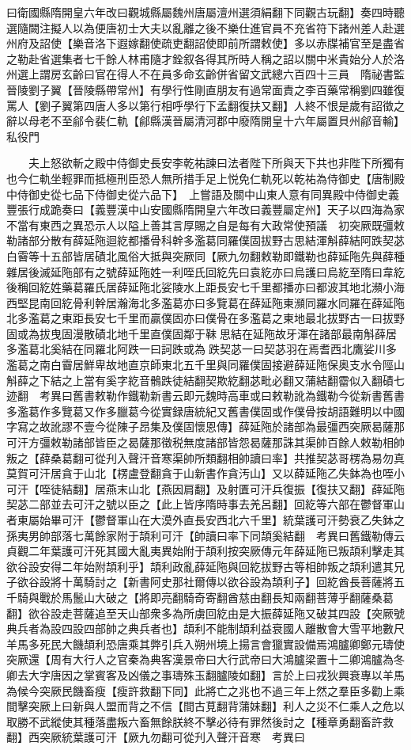 曰衛國縣隋開皇六年改曰觀城縣屬魏州唐屬澶州選須絹翻下同觀古玩翻】奏四時聽選隨闕注擬人以為便唐初士大夫以亂離之後不樂仕進官員不充省符下諸州差人赴選州府及詔使【樂音洛下遐嫁翻使疏吏翻詔使即前所謂敕使】多以赤牒補官至是盡省之勒赴省選集者七千餘人林甫隨才銓叙各得其所時人稱之詔以關中米貴始分人於洛州選上謂房玄齡曰官在得人不在員多命玄齡併省留文武總六百四十三員　隋祕書監晉陵劉子翼【晉陵縣帶常州】有學行性剛直朋友有過常面責之李百藥常稱劉四雖復罵人【劉子翼第四唐人多以第行相呼學行下孟翻復扶又翻】人終不恨是歲有詔徵之辭以母老不至鄃令裴仁軌【鄃縣漢晉屬清河郡中廢隋開皇十六年屬置貝州鄃音輸】私役門

　　夫上怒欲斬之殿中侍御史長安李乾祐諫曰法者陛下所與天下共也非陛下所獨有也今仁軌坐輕罪而抵極刑臣恐人無所措手足上悦免仁軌死以乾祐為侍御史【唐制殿中侍御史從七品下侍御史從六品下】　上嘗語及關中山東人意有同異殿中侍御史義豐張行成跪奏曰【義豐漢中山安國縣隋開皇六年改曰義豐屬定州】天子以四海為家不當有東西之異恐示人以隘上善其言厚賜之自是每有大政常使預議　初突厥既彊敕勒諸部分散有薛延陁迴紇都播骨科幹多濫葛同羅僕固拔野古思結渾斛薛結阿跌契苾白霫等十五部皆居磧北風俗大抵與突厥同【厥九勿翻敕勒即鐵勒也薛延陁先與薛種雜居後滅延陁部有之號薛延陁姓一利咥氏回紇先曰袁紇亦曰烏護曰烏紇至隋曰韋紇後稱回紇姓藥葛羅氏居薛延陁北娑陵水上距長安七千里都播亦曰都波其地北瀕小海西堅昆南回紇骨利幹居瀚海北多濫葛亦曰多覽葛在薛延陁東瀕同羅水同羅在薛延陁北多濫葛之東距長安七千里而贏僕固亦曰僕骨在多濫葛之東地最北拔野古一曰拔野固或為拔曳固漫散磧北地千里直僕固鄰于靺思結在延陁故牙渾在諸部最南斛薛居多濫葛北奚結在同羅北阿跌一曰訶跌或為跌契苾一曰契苾羽在焉耆西北鷹娑川多濫葛之南白霫居鮮卑故地直京師東北五千里與同羅僕固接避薛延陁保奥支水令陘山斛薛之下結之上當有奚字紇音鶻跌徒結翻契欺紇翻苾毗必翻又蒲結翻霤似入翻磧七迹翻　考異曰舊書敕勒作鐵勒新書云即元魏時高車或曰敕勒訛為鐵勒今從新書舊書多濫葛作多覽葛又作多臘葛今從實録唐統紀又舊書僕固或作僕骨按胡語難明以中國字寫之故訛謬不壹今從陳子昂集及僕固懷恩傳】薛延陁於諸部為最彊西突厥曷薩那可汗方彊敕勒諸部皆臣之曷薩那徵税無度諸部皆怨曷薩那誅其渠帥百餘人敕勒相帥叛之【薛桑葛翻可從刋入聲汗音寒渠帥所類翻相帥讀曰率】共推契苾哥楞為易勿真莫賀可汗居貪于山北【楞盧登翻貪于山新書作貪汚山】又以薛延陁乙失鉢為也咥小可汗【咥徒結翻】居燕末山北【燕因肩翻】及射匱可汗兵復振【復扶又翻】薛延陁契苾二部並去可汗之號以臣之【此上皆序隋時事去羌呂翻】回紇等六部在鬱督軍山者東屬始畢可汗【鬱督軍山在大漠外直長安西北六千里】統葉護可汗勢衰乙失鉢之孫夷男帥部落七萬餘家附于頡利可汗【帥讀曰率下同頡奚結翻　考異曰舊鐵勒傳云貞觀二年葉護可汗死其國大亂夷異始附于頡利按突厥傳元年薛延陁已叛頡利擊走其欲谷設安得二年始附頡利乎】頡利政亂薛延陁與回紇拔野古等相帥叛之頡利遣其兄子欲谷設將十萬騎討之【新書阿史那社爾傳以欲谷設為頡利子】回紇酋長菩薩將五千騎與戰於馬鬛山大破之【將即亮翻騎奇寄翻酋慈由翻長知兩翻菩薄乎翻薩桑葛翻】欲谷設走菩薩追至天山部衆多為所虜回紇由是大振薛延陁又破其四設【突厥號典兵者為設四設四部帥之典兵者也】頡利不能制頡利益衰國人離散會大雪平地數尺羊馬多死民大饑頡利恐唐乘其弊引兵入朔州境上揚言會獵實設備焉鴻臚卿鄭元璹使突厥還【周有大行人之官秦為典客漢景帝曰大行武帝曰大鴻臚梁置十二卿鴻臚為冬卿去大字唐因之掌賓客及凶儀之事璹殊玉翻臚陵如翻】言於上曰戎狄興衰專以羊馬為候今突厥民饑畜瘦【瘦許救翻下同】此將亡之兆也不過三年上然之羣臣多勸上乘間擊突厥上曰新與人盟而背之不信【間古莧翻背蒲妹翻】利人之災不仁乘人之危以取勝不武縱使其種落盡叛六畜無餘朕終不擊必待有罪然後討之【種章勇翻畜許救翻】西突厥統葉護可汗【厥九勿翻可從刋入聲汗音寒　考異曰